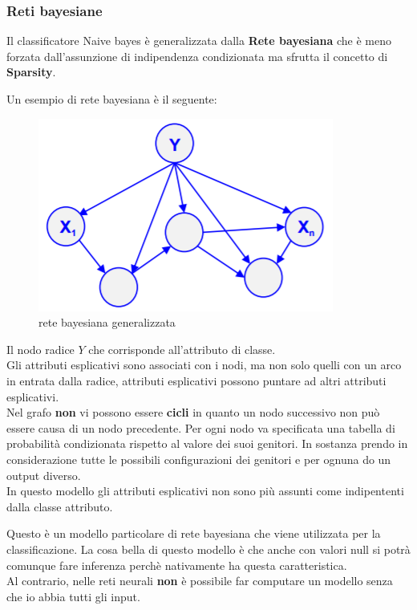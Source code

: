 \subsubsection{Reti bayesiane}
Il classificatore Naive bayes \`e generalizzata dalla \textbf{Rete bayesiana} che \`e meno forzata dall'assunzione di indipendenza condizionata ma sfrutta il concetto di \textbf{Sparsity}. 

Un esempio di rete bayesiana è il seguente:

\begin{figure}[H]
	\centering
	\includegraphics[height=0.35 \linewidth]{classification/pict/networkbayes.png}
	\caption{rete bayesiana generalizzata}
\end{figure}

Il nodo radice $Y$ che corrisponde all'attributo di classe.\\

Gli attributi esplicativi sono associati con i nodi, ma non solo quelli con un arco in entrata dalla radice, attributi esplicativi possono puntare ad altri attributi esplicativi.\\

Nel grafo \textbf{non} vi possono essere \textbf{cicli} in quanto un nodo successivo non pu\`o essere causa di un nodo precedente. Per ogni nodo va specificata una tabella di probabilità condizionata rispetto al valore dei suoi genitori. In sostanza prendo in considerazione tutte le possibili configurazioni dei genitori e per ognuna do un output diverso. \\

In questo modello gli attributi esplicativi non sono più assunti come indipententi dalla classe attributo.

Questo è un modello particolare di rete bayesiana che viene utilizzata per la classificazione. La cosa bella di questo modello \`e che anche con valori null si potrà comunque fare inferenza perchè nativamente ha questa caratteristica. \\

Al contrario, nelle reti neurali \textbf{non} \`e possibile far computare un modello senza che io abbia tutti gli input. 
\\
